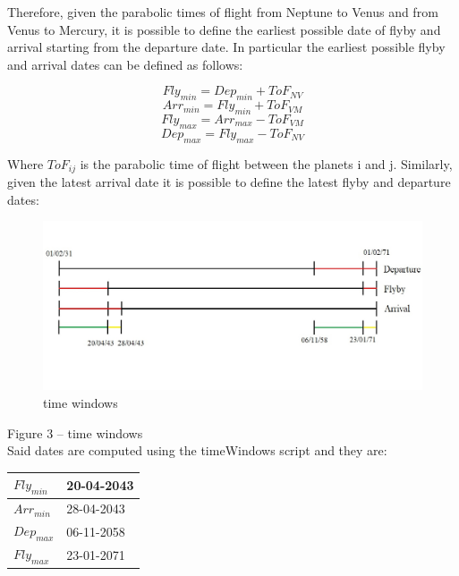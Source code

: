 \documentclass[11pt,a4paper]{report}
\begin{document}
Therefore, given the parabolic times of flight from Neptune to Venus and from Venus to Mercury, it is possible to define the earliest possible date of flyby and arrival starting from the departure date. In particular the earliest possible flyby  and arrival dates can be defined as follows:

\begin{equation*}
    Fly_{min}=Dep_{min}+ ToF_{NV}
\end{equation*}
\begin{equation*}
    Arr_{min}=Fly_{min} + ToF_{VM}
\end{equation*}
\begin{equation*}
    Fly_{max}=Arr_{max}- ToF_{VM}
\end{equation*}
\begin{equation*}
    Dep_{max}=Fly_{max} - ToF_{NV}
\end{equation*}

Where $ToF_{ij}$ is the parabolic time of flight between the planets i and j.
Similarly, given the latest arrival date it is possible to define the latest flyby and departure dates:

\begin{figure}[H]
\centering
\includegraphics[width = \textwidth]{time_windows.jpg}
\caption{time windows}
\end{figure}

Figure 3 – time windows\\
Said dates are computed using the timeWindows script and they are:

\begin{table}[H]
\centering
\begin{tabular}{|l|l|}
\hline
$Fly_{min}$ & 20-04-2043 \\ \hline
$Arr_{min}$ & 28-04-2043 \\ \hline
$Dep_{max}$ & 06-11-2058 \\ \hline
$Fly_{max}$ & 23-01-2071 \\ \hline
\end{tabular}
\end{table}
\end{document}
